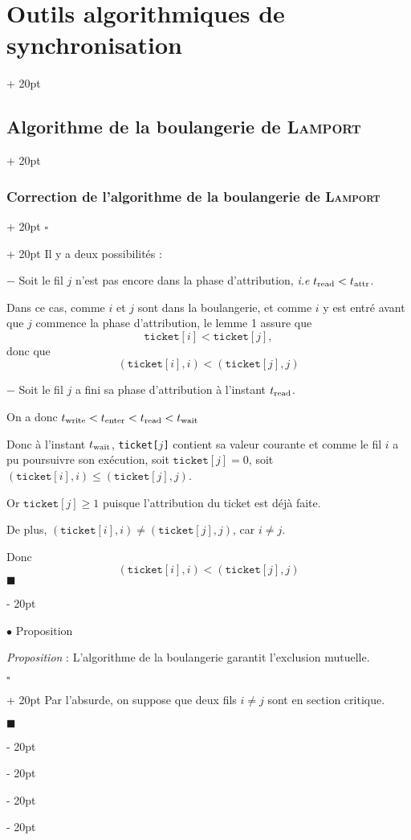\documentclass[a4paper, 12pt, twoside]{article}
\renewcommand{\le}{\leqslant}
\renewcommand{\ge}{\geqslant}
\newcommand{\ind}[1][20pt]{\advance\leftskip + #1}
\newcommand{\deind}[1][20pt]{\advance\leftskip - #1}
\newenvironment{indt}[2][20pt]{#2 \par \ind[#1]}{\par \deind} %
\newenvironment{proof}[1][{}]{\begin{indt}{$\square$ #1}}{$\blacksquare$ \end{indt}}
\begin{document}
\begin{indt}{\section{Outils algorithmiques de synchronisation}}
\begin{indt}{\subsection{Algorithme de la boulangerie de \textsc{Lamport}}}
\begin{indt}{\subsubsection{Correction de l'algorithme de la boulangerie de \textsc{Lamport}}}
\begin{proof}
                    Il y a deux possibilités :

                    $-$ Soit le fil $j$ n'est pas encore dans la phase d'attribution, \textit{i.e} $t_{\rm read} < t_{\rm attr}$.

                    Dans ce cas, comme $i$ et $j$ sont dans la boulangerie, et comme $i$ y est entré avant que $j$ commence la phase d'attribution, le lemme 1 assure que
                    \[
                        \mathtt{ticket}[i] < \mathtt{ticket}[j],
                    \]
                    donc que
                    \[
                        (\mathtt{ticket}[i], i) < (\mathtt{ticket}[j], j)
                    \]

                    $-$ Soit le fil $j$ a fini sa phase d'attribution à l'instant $t_{\rm read}$.

                    On a donc $t_{\rm write} < t_{\rm enter} < t_{\rm read} < t_{\rm wait}$

                    Donc à l'instant $t_{\rm wait}$, \texttt{ticket[$j$]} contient sa valeur courante et comme le fil $i$ a pu poursuivre son exécution, soit $\mathtt{ticket}[j] = 0$, soit $(\mathtt{ticket}[i], i) \le (\mathtt{ticket}[j], j)$.

                    Or $\mathtt{ticket}[j] \ge 1$ puisque l'attribution du ticket est déjà faite.

                    De plus, $(\mathtt{ticket}[i], i) \neq (\mathtt{ticket}[j], j)$, car $i \neq j$.

                    Donc
                    \[
                        (\mathtt{ticket}[i], i) < (\mathtt{ticket}[j], j)
                    \]
                \end{proof}

                \vspace{12pt}
                
                $\bullet$ Proposition

                \begin{emphBox}
                    \textit{Proposition} :
                    L'algorithme de la boulangerie garantit l'exclusion mutuelle.
                \end{emphBox}

                \vspace{6pt}
                
                \begin{proof}
                    Par l'absurde, on suppose que deux fils $i \neq j$ sont en section critique.


\end{proof}
\end{indt}
\end{indt}
\end{indt}
\end{document}
